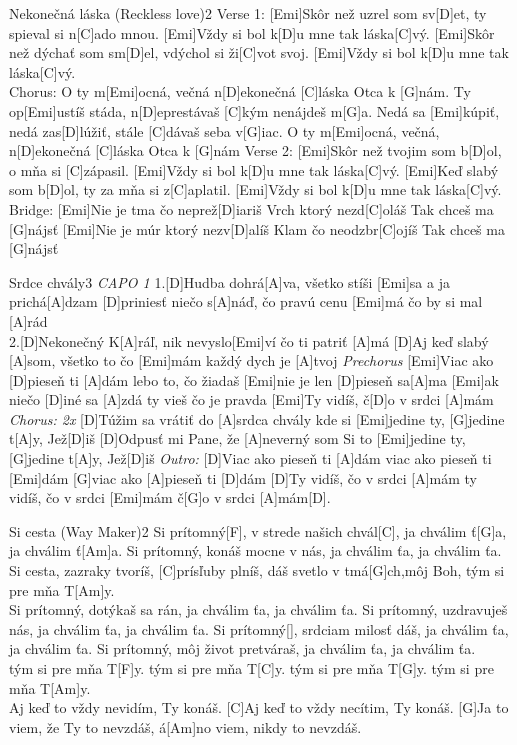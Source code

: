 \documentclass[12pt]{article}
\begin{document}
\begin{song}{Nekonečná láska (Reckless love)}{2}
	Verse 1:
[Emi]Skôr než uzrel som sv[D]et, 
ty spieval si n[C]ado mnou.
[Emi]Vždy si bol k[D]u mne tak láska[C]vý.
[Emi]Skôr než dýchať som sm[D]el, 
vdýchol si ži[C]vot svoj.
[Emi]Vždy si bol k[D]u mne tak láska[C]vý.
\\
Chorus:
O ty m[Emi]ocná, večná n[D]ekonečná 
[C]láska Otca k [G]nám.
Ty op[Emi]ustíš stáda, n[D]eprestávaš 
[C]kým nenájdeš m[G]a.
Nedá sa [Emi]kúpiť, nedá zas[D]lúžiť, 
stále [C]dávaš seba v[G]iac.
O ty m[Emi]ocná, večná, n[D]ekonečná 
[C]láska Otca k [G]nám
\columnbreak
Verse 2:
[Emi]Skôr než tvojim som b[D]ol, 
o mňa si [C]zápasil.
[Emi]Vždy si bol k[D]u mne tak láska[C]vý.
[Emi]Keď slabý som b[D]ol, 
ty za mňa si z[C]aplatil.
[Emi]Vždy si bol k[D]u mne tak láska[C]vý.
\\
Bridge:
[Emi]Nie je tma čo neprež[D]iariš
Vrch ktorý nezd[C]oláš
Tak chceš ma [G]nájsť
[Emi]Nie je múr ktorý nezv[D]alíš
Klam čo neodzbr[C]ojíš
Tak chceš ma [G]nájsť
\end{song}

\begin{song}{Srdce chvály}{3}
\textit{\color{gray}CAPO 1}
1.[D]Hudba dohrá[A]va, všetko stíši [Emi]sa
a ja prichá[A]dzam
[D]priniesť niečo s[A]náď, čo pravú cenu [Emi]má
čo by si mal [A]rád
\\
2.[D]Nekonečný K[A]ráľ, nik nevyslo[Emi]ví
čo ti patriť [A]má
[D]Aj keď slabý [A]som, všetko to čo [Emi]mám
každý dych je [A]tvoj
\columnbreak
\textit{\color{gray}Prechorus}
[Emi]Viac ako [D]pieseň ti [A]dám
lebo to, čo žiadaš
[Emi]nie je len [D]pieseň sa[A]ma
[Emi]ak niečo [D]iné sa [A]zdá
ty vieš čo je pravda
[Emi]Ty vidíš, č[D]o v srdci [A]mám
\\
\textit{\color{gray}Chorus: 2x}
[D]Túžim sa vrátiť do [A]srdca chvály
kde si [Emi]jedine ty, [G]jedine t[A]y, Jež[D]iš
[D]Odpusť mi Pane, že [A]neverný som
Si to [Emi]jedine ty, [G]jedine t[A]y, Jež[D]iš
\columnbreak
\textit{\color{gray}Outro:}
[D]Viac ako pieseň ti [A]dám
viac ako pieseň ti [Emi]dám
[G]viac ako [A]pieseň ti [D]dám
[D]Ty vidíš, čo v srdci [A]mám
ty vidíš, čo v srdci [Emi]mám
č[G]o v srdci [A]mám[D].
\end{song}


\begin{song}{Si cesta (Way Maker)}{2}
Si prítomný[F], v strede našich chvál[C],
ja chválim ť[G]a, ja chválim ť[Am]a.
Si prítomný, konáš mocne v nás, 
ja chválim ťa, ja chválim ťa.
\\
[F]Si cesta, zazraky tvoríš, 
[C]prísľuby plníš, 
dáš svetlo v tmá[G]ch,môj Boh, 
tým si pre mňa T[Am]y.
\\
Si prítomný, dotýkaš sa rán, 
ja chválim ťa, ja chválim ťa.
Si prítomný, uzdravuješ nás, 
ja chválim ťa, ja chválim ťa.
\columnbreak
Si prítomný[], srdciam milosť dáš, 
ja chválim ťa, ja chválim ťa.
Si prítomný, môj život pretváraš, 
ja chválim ťa, ja chválim ťa.
\\ 
tým si pre mňa T[F]y. 
tým si pre mňa T[C]y. 
tým si pre mňa T[G]y. 
tým si pre mňa T[Am]y.
\\
[F]Aj keď to vždy nevidím, Ty konáš.
[C]Aj keď to vždy necítim, Ty konáš.
[G]Ja to viem, že Ty to nevzdáš,
á[Am]no viem, nikdy to nevzdáš.
\end{song}
\end{document}
